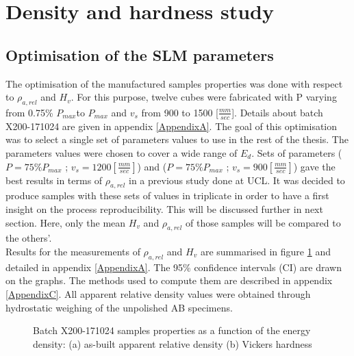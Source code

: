 \section{Density and hardness study}
\subsection{Optimisation of the SLM parameters}
\label{Rparaopti}
The optimisation of the manufactured samples properties was done with respect to $\rho_{a,rel}$ and $H_v$. For this purpose, twelve cubes were fabricated with P varying from 0.75\% $P_{max} $to $P_{max}$ and $v_s$ from 900 to 1500 [$\frac{mm}{sec}$]. Details about batch X200-171024 are given in appendix \ref{AppendixA}. The goal of this optimisation was to select a single set of parameters values to use in the rest of the thesis. The parameters values were chosen to cover a wide range of $E_d$. Sets of parameters ($P=75\% P_{max}$ ; $v_s=1200 [\frac{mm}{sec}]$) and ($P=75\% P_{max}$ ; $v_s=900 [\frac{mm}{sec}]$) gave the best results in terms of $\rho_{a,rel}$ in a previous study done at UCL. It was decided to produce samples with these sets of values in triplicate in order to have a first insight on the process reproducibility. This will be discussed further in next section. Here, only the mean $H_v$ and $\rho_{a,rel}$ of those samples will be compared to the others'.\\

Results for the measurements of $\rho_{a,rel}$ and $H_v$ are summarised in figure \ref{fig:HD2-171024} and detailed in appendix \ref{AppendixA}. The 95\% confidence intervals (CI) are drawn on the graphs. The methods used to compute them are described in appendix \ref{AppendixC}. All apparent relative density values were obtained through hydrostatic weighing of the unpolished AB specimens.\\

\begin{figure}[ht]
\centering
\noindent{}
\decoRule
\caption[Batch X200-171024 samples properties as a function of the energy density: (a) as-built apparent relative density (b) Vickers hardness]{Batch X200-171024 samples properties as a function of the energy density: (a) as-built apparent relative density (b) Vickers hardness}
\label{fig:HD2-171024}
\end{figure} 

